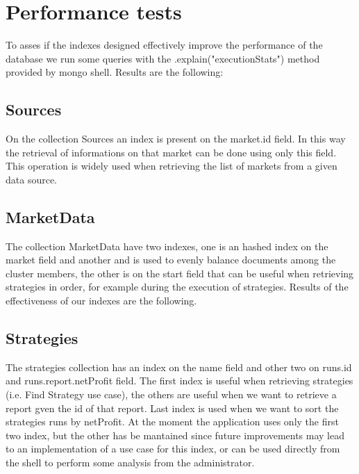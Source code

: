 \section{Performance tests}\label{sec:performancetests}
To asses if the indexes designed effectively improve the performance of the
database we run some queries with the .explain("executionStats") method provided
by mongo shell. Results are the following:

\subsection{Sources}
On the collection Sources an index is present on the market.id field. In this
way the retrieval of informations on that market can be done using only this
field. This operation is widely used when retrieving the list of markets from a
given data source.



\subsection{MarketData}

The collection MarketData have two indexes, one is an hashed index on the market
field and another and is used to evenly balance documents among the cluster
members, the other is on the start field that can be useful when retrieving
strategies in order, for example during the execution of strategies.
Results of the effectiveness of our indexes are the following.






\subsection{Strategies}

The strategies collection has an index on the name field and other two on
runs.id and runs.report.netProfit field. The first index is useful when retrieving strategies
(i.e. Find Strategy use case), the others are useful when we want to retrieve a
report gven the id of that report. Last index is used when we want to sort the
strategies runs by netProfit. At the moment the application uses only the first
two
index, but the other has be mantained since future improvements may lead to an
implementation of a use case for this index, or can be used directly from the
shell to perform some analysis from the administrator.








